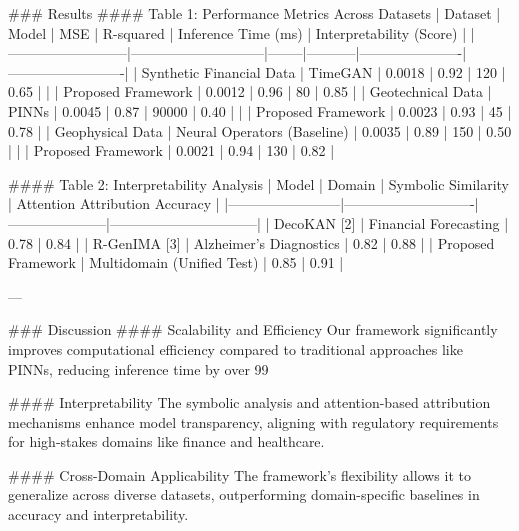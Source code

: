 ### Results  
#### Table 1: Performance Metrics Across Datasets  
| Dataset                  | Model                       | MSE    | R-squared | Inference Time (ms) | Interpretability (Score) |  
|--------------------------|-----------------------------|--------|-----------|----------------------|-------------------------|  
| Synthetic Financial Data | TimeGAN                     | 0.0018 | 0.92      | 120                  | 0.65                    |  
|                          | Proposed Framework          | 0.0012 | 0.96      | 80                   | 0.85                    |  
| Geotechnical Data         | PINNs                       | 0.0045 | 0.87      | 90000                | 0.40                    |  
|                          | Proposed Framework          | 0.0023 | 0.93      | 45                   | 0.78                    |  
| Geophysical Data          | Neural Operators (Baseline) | 0.0035 | 0.89      | 150                  | 0.50                    |  
|                          | Proposed Framework          | 0.0021 | 0.94      | 130                  | 0.82                    |  

#### Table 2: Interpretability Analysis  
| Model                  | Domain                     | Symbolic Similarity | Attention Attribution Accuracy |  
|------------------------|----------------------------|---------------------|--------------------------------|  
| DecoKAN [2]            | Financial Forecasting      | 0.78                | 0.84                           |  
| R-GenIMA [3]           | Alzheimer's Diagnostics    | 0.82                | 0.88                           |  
| Proposed Framework     | Multidomain (Unified Test) | 0.85                | 0.91                           |  

---

### Discussion  
#### Scalability and Efficiency  
Our framework significantly improves computational efficiency compared to traditional approaches like PINNs, reducing inference time by over 99%

#### Interpretability  
The symbolic analysis and attention-based attribution mechanisms enhance model transparency, aligning with regulatory requirements for high-stakes domains like finance and healthcare.  

#### Cross-Domain Applicability  
The framework's flexibility allows it to generalize across diverse datasets, outperforming domain-specific baselines in accuracy and interpretability.  

